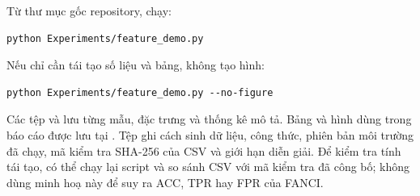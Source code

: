 Từ thư mục gốc repository, chạy:
\begin{verbatim}
python Experiments/feature_demo.py
\end{verbatim}
Nếu chỉ cần tái tạo số liệu và bảng, không tạo hình:
\begin{verbatim}
python Experiments/feature_demo.py --no-figure
\end{verbatim}

Các tệp  và  lưu từng mẫu, đặc trưng và thống kê mô tả. Bảng và hình dùng trong báo cáo được lưu tại . Tệp  ghi cách sinh dữ liệu, công thức, phiên bản môi trường đã chạy, mã kiểm tra SHA-256 của CSV và giới hạn diễn giải. Để kiểm tra tính tái tạo, có thể chạy lại script và so sánh CSV với mã kiểm tra đã công bố; không dùng minh hoạ này để suy ra ACC, TPR hay FPR của FANCI.
